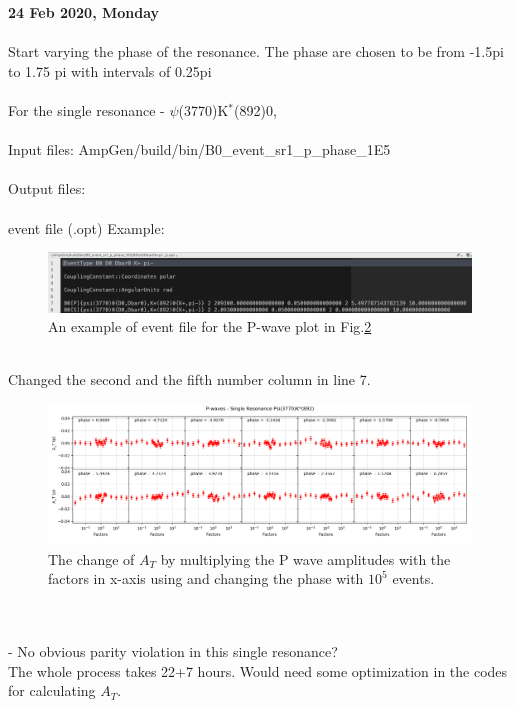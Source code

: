 \clearpage
\noindent\textbf{24 Feb 2020, Monday}
\\
\\
Start varying the phase of the resonance. The phase are chosen to be from -1.5pi to 1.75 pi with intervals of 0.25pi
\\
\\
For the single resonance - $\psi$(3770)K$^*$(892)0, 
\\
\\
\indent Input files: AmpGen/build/bin/B0\_event\_sr1\_p\_phase\_1E5
\\
\\
\indent Output files: 
\\
\\
event file (.opt) Example:
\\
\begin{figure}[h]
\center
\includegraphics*[width=0.96\linewidth]{p_wave/event_info_combine_phase_1E5}
\caption{An example of event file for the P-wave plot in Fig.\ref{spd_waves_combine_phase_1E5}}
\label{event_info_combine_phase_1E5}
\end{figure}
\\
Changed the second and the fifth number column in line 7.
\begin{figure}[h]
\center
\includegraphics*[width=1.06\linewidth]{p_wave/spd_waves_combine_phase_1E5}
\caption{The change of $A_T$ by multiplying the P wave amplitudes with the factors in x-axis using and changing the phase with $10^5$ events. }
\label{spd_waves_combine_phase_1E5}
\end{figure}
\\
\\
- No obvious parity violation in this single resonance?
\\
The whole process takes 22+7 hours.
Would need some optimization in the codes for calculating $A_T$.

